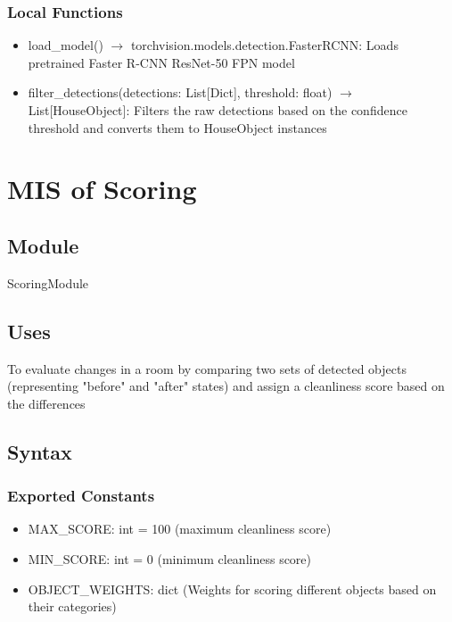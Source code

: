 \documentclass[12pt, titlepage]{article}
\begin{document}
\subsubsection{Local Functions}

\begin{itemize}
  \item load{\_}model() $\rightarrow$ torchvision.models.detection.FasterRCNN: Loads pretrained Faster R-CNN ResNet-50 FPN model
  \item filter{\_}detections(detections: List[Dict], threshold: float) $\rightarrow$ List[HouseObject]: Filters the raw detections based on the confidence threshold and converts them to HouseObject instances
\end{itemize}

\newpage

\section{MIS of Scoring} \label{Module} 

\subsection{Module}

ScoringModule

\subsection{Uses}
To evaluate changes in a room by comparing two sets of detected objects (representing "before" and "after" states) and assign a cleanliness score based on the differences

\subsection{Syntax}

\subsubsection{Exported Constants}

\begin{itemize}
  \item MAX{\_}SCORE: int = 100 (maximum cleanliness score)
  \item MIN{\_}SCORE: int = 0 (minimum cleanliness score)
  \item OBJECT{\_}WEIGHTS: dict (Weights for scoring different objects based on their categories)
\end{itemize}
\end{document}
